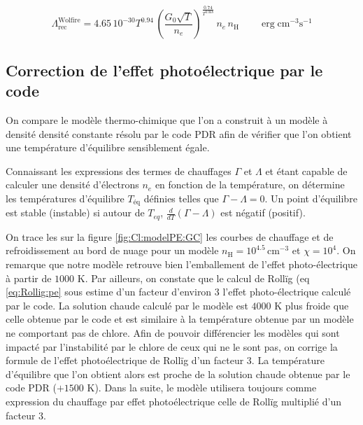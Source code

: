 \begin{equation}
    \Lambda_{\mathrm{rec}}^{\mathrm{Wolfire}} = 4.65\,10^{-30} T^{0.94} \, (\frac{G_0 \sqrt{T}}{n_e})^{\frac{0.74}{T^{0.068}}} \, n_e \, n_\mathrm{H} \qquad \operatorname{erg} \mathrm{cm}^{-3} \mathrm{s}^{-1}
\end{equation}


\subsection{Correction de l'effet photoélectrique par le code}

On compare le modèle thermo-chimique que l'on a construit à un modèle à densité densité constante résolu par le code PDR afin de vérifier que l'on obtient une température d'équilibre sensiblement égale. \newline

Connaissant les expressions des termes de chauffages $\Gamma$ et $\Lambda$ et étant capable de calculer une densité d'électrons $n_e$ en fonction de la température, on détermine les températures d'équilibre $T_{\mathrm{éq}}$ définies telles que $\Gamma - \Lambda  = 0$. Un point d'équilibre est stable (instable) si autour de $T_{eq}$, $\frac{d}{dT}(\Gamma - \Lambda)$ est négatif (positif). \newline 

On trace les sur la figure \ref{fig:Cl:modelPE:GC} les courbes de chauffage et de refroidissement au bord de nuage pour un modèle $n_\mathrm{H} = 10^{4.5} \,\mathrm{cm}^{-3}$ et $\chi = 10^4$. On remarque que notre modèle retrouve bien l'emballement de l'effet photo-électrique à partir de $1000$ K. Par ailleurs, on constate que le calcul de Rollïg (eq \ref{eq:Rollig:pe} sous estime d'un facteur d'environ 3 l'effet photo-électrique calculé par le code. La solution chaude calculé par le modèle est $4000$ K plus froide que celle obtenue par le code et est similaire à la température obtenue par un modèle ne comportant pas de chlore. Afin de pouvoir différencier les modèles qui sont impacté par l'instabilité par le chlore de ceux qui ne le sont pas, on corrige la formule de l'effet photoélectrique de Rollïg d'un facteur 3. La température d'équilibre que l'on obtient alors est proche de la solution chaude obtenue par le code PDR ($+1500$ K). Dans la suite, le modèle utilisera toujours comme expression du chauffage par effet photoélectrique celle de Rollïg multiplié d'un facteur 3. 


